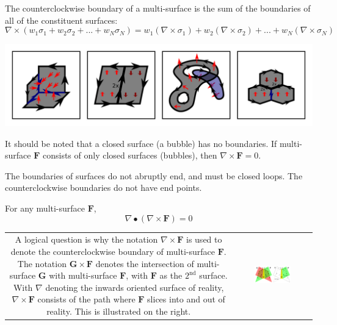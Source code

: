 The counterclockwise boundary of a multi-surface is the sum of the boundaries of all of the constituent surfaces:
\[\nabla \times (w_1 \sigma_1 + w_2 \sigma_2 + ... + w_N \sigma_N)
= w_1(\nabla \times \sigma_1) + w_2(\nabla \times \sigma_2) + ... + w_N(\nabla \times \sigma_N)\]

\begin{center}
\includegraphics[width = \textwidth]{Boundaries/Surface_boundaries/surface_boundary_examples_2}
\end{center}

\begin{thm}
It should be noted that a closed surface (a bubble) has no boundaries. If multi-surface \(\mathbf{F}\) consists of only closed surfaces (bubbles), then \(\nabla \times \mathbf{F} = 0\). 
\end{thm}

The boundaries of surfaces do not abruptly end, and must be closed loops. The counterclockwise boundaries do not have end points. 
\begin{thm}
For any multi-surface \(\mathbf{F}\), 
\[\nabla \bullet (\nabla \times \mathbf{F}) = 0\]
\end{thm}

\begin{tabular}{cc}
\parbox{0.5\textwidth}{
A logical question is why the notation \(\nabla \times \mathbf{F}\) is used to denote the counterclockwise boundary of multi-surface \(\mathbf{F}\). The notation \(\mathbf{G} \times \mathbf{F}\) denotes the intersection of multi-surface \(\mathbf{G}\) with multi-surface \(\mathbf{F}\), with \(\mathbf{F}\) as the \(2^\text{nd}\) surface. With \(\nabla\) denoting the inwards oriented surface of reality, \(\nabla \times \mathbf{F}\) consists of the path where \(\mathbf{F}\) slices into and out of reality. This is illustrated on the right.
} & \parbox{0.5\textwidth}{
\includegraphics[width = 0.5\textwidth]{Boundaries/Surface_boundaries/right_hand_rule_for_boundaries}
}
\end{tabular}




